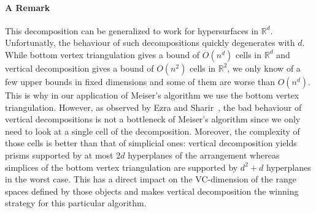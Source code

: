 \paragraph{A Remark}
This decomposition can be generalized to work for hypersurfaces in
\(\mathbb{R}^d\). Unfortunatly, the behaviour of such decompositions quickly
degenerates with \(d\).
While bottom vertex triangulation gives a bound of \(O(n^d)\) cells in
\(\mathbb{R}^d\) and
vertical decomposition gives a bound of \(O(n^2)\) cells in \(\mathbb{R}^2\),
we only know of a few upper bounds in fixed dimensions and some of them are
worse than \(O(n^d)\). This is why in our application of Meiser's algorithm we
use the bottom vertex triangulation. However, as observed by Ezra and
Sharir~\cite{ES17}, the bad behaviour of vertical decompositions is not a
bottleneck of Meiser's algorithm since we only need to look at a single cell of
the decomposition. Moreover, the complexity of those cells is better than that
of simplicial ones: vertical decomposition yields prisms supported by at most
\(2d\) hyperplanes of the arrangement whereas simplices of
the bottom vertex triangulation are supported by \(d^2 + d\) hyperplanes in the
worst case. This has a direct impact on the VC-dimension of the range spaces
defined by those objects and makes vertical decomposition the winning strategy
for this particular algorithm.
